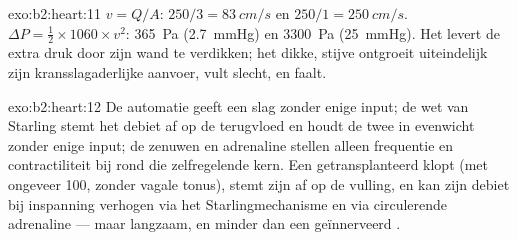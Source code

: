 \begin{solution}{exo:b2:heart:11}
$v = Q/A$: $250/3 = \qty{83}{cm/s}$ en $250/1 = \qty{250}{cm/s}$.
$\Delta P = \tfrac12\times 1060\times v^{2}$: \qty{365}{Pa}
(\qty{2.7}{mmHg}) en \qty{3300}{Pa} (\qty{25}{mmHg}). Het  levert
de extra druk door zijn wand te verdikken; het dikke, stijve 
ontgroeit uiteindelijk zijn kransslagaderlijke aanvoer, vult slecht, en
faalt.
\end{solution}

\begin{solution}{exo:b2:heart:12}
De automatie geeft een slag zonder enige input; de wet van Starling stemt
het debiet af op de terugvloed en houdt de twee  in evenwicht
zonder enige input; de zenuwen en adrenaline stellen alleen frequentie en
contractiliteit bij rond die zelfregelende kern. Een getransplanteerd 
klopt (met ongeveer 100, zonder vagale tonus), stemt zijn  af op
de vulling, en kan zijn debiet bij inspanning verhogen via het
Starlingmechanisme en via circulerende adrenaline --- maar langzaam, en
minder dan een geïnnerveerd .
\end{solution}

